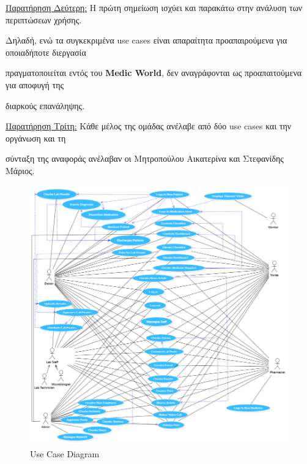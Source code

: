 \documentclass{article}
\begin{document}
\vspace{0.3cm}

\underline{Παρατήρηση Δεύτερη:} Η πρώτη σημείωση ισχύει και παρακάτω στην ανάλυση των περιπτώσεων χρήσης. \par \vspace{0.1cm} Δηλαδή, ενώ τα συγκεκριμένα use cases είναι απαραίτητα προαπαιρούμενα για οποιαδήποτε διεργασία \par πραγματοποιείται εντός του \textbf{Medic World}, δεν αναγράφονται ως προαπαιτούμενα για αποφυγή της \par διαρκούς επανάληψης.  

\vspace{0.3cm}

\underline{Παρατήρηση Τρίτη:} Κάθε μέλος της ομάδας ανέλαβε από δύο use cases και την οργάνωση και τη \par \vspace{0.1cm} σύνταξη της αναφοράς ανέλαβαν οι Μητροπούλου Αικατερίνα και Στεφανίδης Μάριος.  

\newpage

\begin{figure}[!htb]
        \centering
        \includegraphics[width=1.1\textwidth]{UML.png}
        \caption{\label{fig: UML} Use Case Diagram}
\end{figure}
\end{document}
